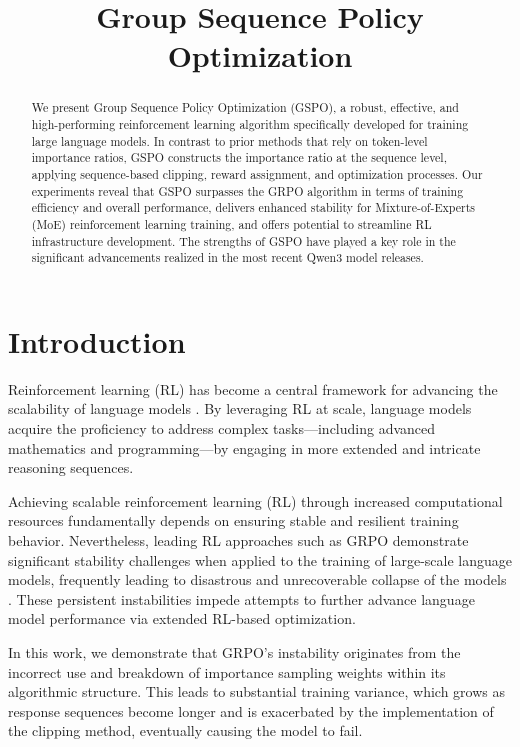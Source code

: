 \title{Group Sequence Policy Optimization}

\begin{abstract}
We present Group Sequence Policy Optimization (GSPO), a robust, effective, and high-performing reinforcement learning algorithm specifically developed for training large language models. In contrast to prior methods that rely on token-level importance ratios, GSPO constructs the importance ratio at the sequence level, applying sequence-based clipping, reward assignment, and optimization processes. Our experiments reveal that GSPO surpasses the GRPO algorithm in terms of training efficiency and overall performance, delivers enhanced stability for Mixture-of-Experts (MoE) reinforcement learning training, and offers potential to streamline RL infrastructure development. The strengths of GSPO have played a key role in the significant advancements realized in the most recent Qwen3 model releases.
\end{abstract}

\section{Introduction}
\label{sec:intro}

Reinforcement learning (RL) has become a central framework for advancing the scalability of language models \citep{o1,dpsk-r1,qwq32b,qwen3}. By leveraging RL at scale, language models acquire the proficiency to address complex tasks—including advanced mathematics and programming—by engaging in more extended and intricate reasoning sequences.

Achieving scalable reinforcement learning (RL) through increased computational resources fundamentally depends on ensuring stable and resilient training behavior. Nevertheless, leading RL approaches such as GRPO \citep{grpo} demonstrate significant stability challenges when applied to the training of large-scale language models, frequently leading to disastrous and unrecoverable collapse of the models \citep{qwen3, minimax-m1}. These persistent instabilities impede attempts to further advance language model performance via extended RL-based optimization.

In this work, we demonstrate that GRPO's instability originates from the incorrect use and breakdown of importance sampling weights within its algorithmic structure. This leads to substantial training variance, which grows as response sequences become longer and is exacerbated by the implementation of the clipping method, eventually causing the model to fail.

